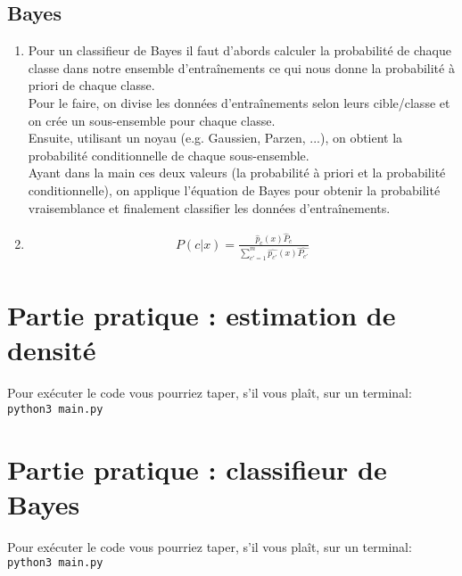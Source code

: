 \documentclass{article}
\begin{document}
\subsection{Bayes}
\begin{enumerate}[label=(\alph*)]
\item
  Pour un classifieur de Bayes il faut d'abords calculer la
  probabilité de chaque classe dans notre ensemble d'entraînements ce
  qui nous donne la probabilité à priori de chaque classe.\\
  Pour le faire, on divise les données d'entraînements selon leurs
  cible/classe et on crée un sous-ensemble pour chaque classe.\\
  Ensuite, utilisant un noyau (e.g. Gaussien, Parzen, ...), on
  obtient la probabilité conditionnelle de chaque sous-ensemble.\\
  Ayant dans la main ces deux valeurs (la probabilité à priori et la
  probabilité conditionnelle), on applique l'équation de
  Bayes pour obtenir la probabilité vraisemblance et finalement
  classifier les données d'entraînements.
\item
  \begin{align*}
    P(c|x)=\frac{\hat{p}_c(x)\hat{P}_c}{\sum_{c'=1}^m \hat{p_{c'}}(x)\hat{P_{c'}}}
  \end{align*}

\end{enumerate}

\section{Partie pratique : estimation de densité}
Pour exécuter le code vous pourriez taper, s'il vous plaît, sur un terminal:\\
\verb+python3 main.py+

\section{Partie pratique : classifieur de Bayes}
Pour exécuter le code vous pourriez taper, s'il vous plaît, sur un terminal:\\
\verb+python3 main.py+
\end{document}
